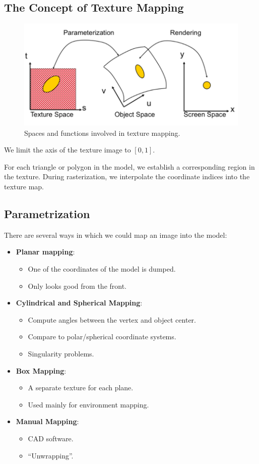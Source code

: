 \documentclass[11pt]{article}
\begin{document}
\subsection{The Concept of Texture Mapping}
\begin{figure}[htb!]
  \centering
  \caption{Spaces and functions involved in texture mapping.}
  \includegraphics[scale=0.3]{texturemapping}
\end{figure}
We limit the axis of the texture image to $[0, 1]$.

For each triangle or polygon in the model, we establish a corresponding region in the texture.
During rasterization, we interpolate the coordinate indices into the texture map.

\subsection{Parametrization}
There are several ways in which we could map an image into the model:
\begin{itemize}
  \item \textbf{Planar mapping}:
    \begin{itemize}
      \item One of the coordinates of the model is dumped.
      \item Only looks good from the front.
    \end{itemize}
  \item \textbf{Cylindrical and Spherical Mapping}:
    \begin{itemize}
      \item Compute angles between the vertex and object center.
      \item Compare to polar/spherical coordinate systems.
      \item Singularity problems.
    \end{itemize}
  \item \textbf{Box Mapping}:
    \begin{itemize}
      \item A separate texture for each plane.
      \item Used mainly for environment mapping.
    \end{itemize}
  \item \textbf{Manual Mapping}:
    \begin{itemize}
      \item CAD software.
      \item ``Unwrapping''.
    \end{itemize}
\end{itemize}
\end{document}
